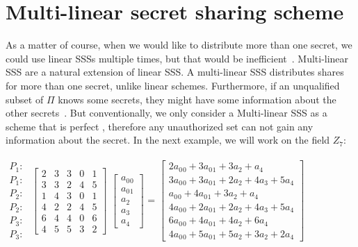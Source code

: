\documentclass[12pt, a4paper, oneside]{book}
\begin{document}
    \section{Multi-linear secret sharing scheme}
    As a matter of course, when we would like to distribute more than one secret, we could use linear SSSs multiple times, but that would be inefficient~\cite{MultiLAmosB}. Multi-linear SSS are a natural extension of linear SSS. A multi-linear SSS distributes shares for more than one secret, unlike linear schemes. Furthermore, if an unqualified subset of $\Pi$ knows some secrets, they might have some information about the other secrets~\cite{CBlundo1993Efficient}. But conventionally, we only consider a Multi-linear SSS as a scheme that is perfect \cite{MultiLAmosB}, therefore any unauthorized set can not gain any information about the secret. In the next example, we will work on the field $Z_7$: \\~\\
    {
    \vspace{-1.5cm}
        $
        \begin{matrix}
        P_1:\\
        P_1:\\
        P_2:\\
        P_2:\\
        P_3:\\
        P_3:
        \end{matrix}
        $
    \vspace{-0,5cm}
        $
        \begin{bmatrix}
        2 & 3 & 3 & 0 & 1\\
        3 & 3 & 2 & 4 & 5\\
        1 & 4 & 3 & 0 & 1\\
        4 & 2 & 2 & 4 & 5\\
        6 & 4 & 4 & 0 & 6\\
        4 & 5 & 5 & 3 & 2
        \end{bmatrix}
        $
        $
        \begin{bmatrix}
        a_0{_0}\\
        a_0{_1}\\
        a_2\\
        a_3\\
        a_4
        \end{bmatrix}
        $
        {=}
        $
        \begin{bmatrix}
        2a_0{_0} {+} 3a_0{_1} {+} 3a_2 {+}  a_4\\
        3a_0{_0} {+} 3a_0{_1} {+} 2a_2 {+} 4a_3 {+} 5a_4\\
        a_0{_0} {+} 4a_0{_1} {+} 3a_2 {+} a_4\\
        4a_0{_0} {+} 2a_0{_1} {+} 2a_2 {+} 4a_3 {+} 5a_4\\
        6a_0{_0} {+} 4a_0{_1} {+} 4a_2 {+} 6a_4\\
        4a_0{_0} {+} 5a_0{_1} {+} 5a_2 {+} 3a_2 {+}  2a_4
        \end{bmatrix}
        $
    }
    \vspace{2.3cm}
    \\
    
\end{document}
